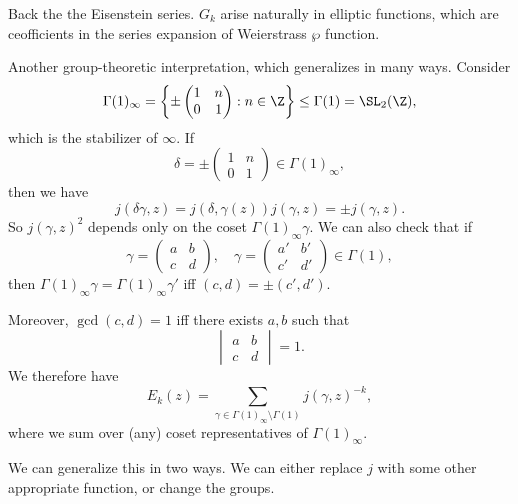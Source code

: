 \documentclass[a4paper]{article}
\begin{document}
Back the the Eisenstein series. $G_k$ arise naturally in elliptic functions, which are ceofficients in the series expansion of Weierstrass $\wp$ function. %

Another group-theoretic interpretation, which generalizes in many ways. Consider
\[
  \Gamma(1)_\infty = \left\{
    \pm
    \begin{pmatrix}
      1 & n\\
      0 & 1
    \end{pmatrix}: n \in \Z
  \right\} \leq \Gamma(1) = \SL_2(\Z),
\]
which is the stabilizer of $\infty$. If
\[
  \delta = \pm
  \begin{pmatrix}
    1 & n\\
    0 & 1
  \end{pmatrix}
  \in \Gamma(1)_\infty,
\]
then we have
\[
  j(\delta\gamma, z) = j(\delta, \gamma(z)) j(\gamma, z) = \pm j(\gamma, z).
\]
So $j(\gamma, z)^2$ depends only on the coset $\Gamma(1)_\infty \gamma$. We can also check that if
\[
  \gamma =
  \begin{pmatrix}
    a & b\\
    c & d
  \end{pmatrix},\quad
  \gamma = 
  \begin{pmatrix}
    a' & b'\\
    c' & d'
  \end{pmatrix} \in \Gamma(1),
\]
then $\Gamma(1)_\infty \gamma = \Gamma(1)_\infty \gamma'$ iff $(c, d) = \pm (c', d')$.

Moreover, $\gcd(c, d) = 1 $ iff there  exists $a, b$ such that
\[
  \begin{vmatrix}
    a & b\\
    c & d
  \end{vmatrix} = 1.
\]
We therefore have 
\[
  E_k(z) = \sum_{\gamma \in \Gamma(1)_\infty \setminus \Gamma(1)} j(\gamma, z)^{-k},
\]
where we sum over (any) coset representatives of $\Gamma(1)_\infty$.

We can generalize this in two ways. We can either replace $j$ with some other appropriate function, or change the groups.
\printindex
\end{document}
